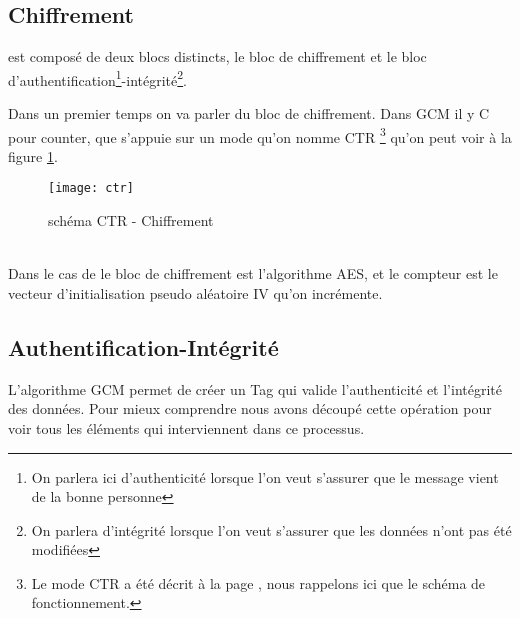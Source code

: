 \subsection{Chiffrement}

\aes est composé de deux blocs distincts, le bloc de chiffrement et le bloc d'authentification\footnote{On parlera ici d'authenticité lorsque l'on veut s'assurer que le message vient de la bonne personne}-intégrité\footnote{On parlera d'intégrité lorsque l'on veut s'assurer que les données n'ont pas été modifiées}.

Dans un premier temps on va parler du bloc de chiffrement. Dans GCM il y C pour \og counter\fg{}, \cad que \aes s'appuie sur un mode qu'on nomme CTR \footnote{Le mode CTR a été décrit à la page \pageref{ctr}, nous rappelons ici que le schéma de fonctionnement.} qu'on peut voir à la figure \ref{schema CTR}.




\begin{figure}[!h]
  \centering
  \texttt{[image: ctr]}
  \caption{schéma CTR - Chiffrement \cite{wiki}}
  \label{schema CTR}
\end{figure}

 ~\\

 Dans le cas de \aes le bloc de chiffrement est l'algorithme AES, et le compteur est le vecteur d'initialisation pseudo aléatoire IV qu'on incrémente.


\subsection{Authentification-Intégrité}

L'algorithme GCM permet de créer un Tag qui valide l'authenticité et l'intégrité des données. Pour mieux comprendre nous avons découpé cette opération pour voir tous les éléments qui interviennent dans ce processus.

